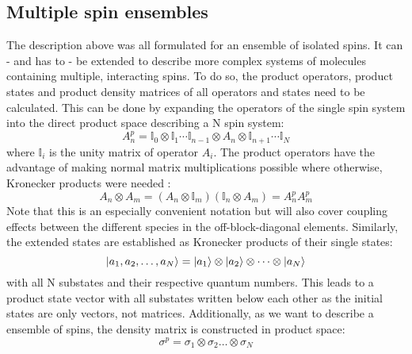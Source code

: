         \subsection{Multiple spin ensembles}
            The description above was all formulated for an ensemble of isolated spins. It can - and has to - be extended to describe more complex systems of molecules containing multiple, interacting spins. To do so, the product operators, product states and product density matrices of all operators and states need to be calculated. This can be done by expanding the operators of the single spin system into the direct product space describing a N spin system:
            \begin{equation*}
                A^p_n = \mathbb{I}_0\otimes\mathbb{I}_1\cdots \mathbb{I}_{n-1} \otimes A_n \otimes \mathbb{I}_{n+1}\cdots \mathbb{I}_N
            \end{equation*}
            where $\mathbb{I}_i$ is the unity matrix of operator $A_i$. The product operators have the advantage of making normal matrix multiplications possible where otherwise, Kronecker products were needed \cite{green_theory_2012-1}:
            \begin{equation}
                A_n\otimes A_m = (A_n \otimes \mathbb{I}_m)(\mathbb{I}_n \otimes A_m) = A^p_nA^p_m
            \end{equation}
            Note that this is an especially convenient notation but will also cover coupling effects between the different species in the off-block-diagonal elements. Similarly, the extended states are established as Kronecker products of their single states:
            \begin{equation}
                \ket{a_1,a_2, \dots, a_N} = \ket{a_1}\otimes\ket{a_2}\otimes\dots\otimes\ket{a_N}
            \end{equation}
            with all N substates and their respective quantum numbers. This leads to a product state vector with all substates written below each other as the initial states are only vectors, not matrices. Additionally, as we want to describe a ensemble of spins, the density matrix is constructed in product space:
            \begin{equation}
                \sigma^p = \sigma_1 \otimes\sigma_2\dots\otimes\sigma_N
            \end{equation}
